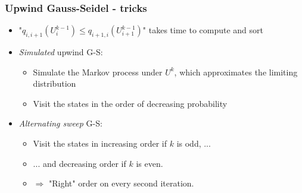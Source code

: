 \documentclass[bigger,handout]{beamer}
\begin{document}
\begin{frame}%

\frametitle{Upwind Gauss-Seidel - tricks}

\begin{itemize}
\item "$q_{i,i+1}(U_{i}^{k-1})\leq q_{i+1,i}(U_{i+1}^{k-1})$" takes time to
compute and sort

\item \emph{Simulated} upwind G-S:

\begin{itemize}
\item Simulate the Markov process under $U^{k}$, \newline
which approximates the limiting distribution

\item Visit the states in the order of decreasing probability
\end{itemize}

\item \emph{Alternating sweep} G-S:

\begin{itemize}
\item Visit the states in increasing order if $k$ is odd, ...

\item ... and decreasing order if $k$ is even.

\item $\Rightarrow $ "Right" order on every second iteration.
\end{itemize}
\end{itemize}



\end{frame}%
\end{document}
